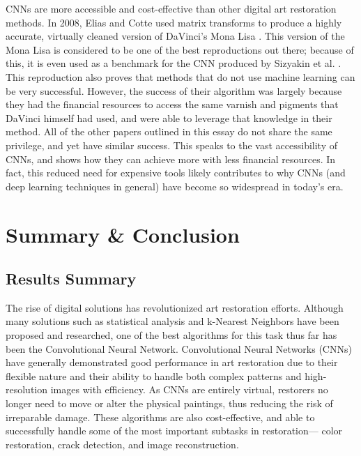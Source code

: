 \documentclass[a4paper,11pt]{article}
\begin{document}
CNNs are more accessible and cost-effective than other digital art restoration methods. In 2008, Elias and Cotte used matrix transforms to produce a highly accurate, virtually cleaned version of DaVinci's Mona Lisa \cite{elias}. This version of the Mona Lisa is considered to be one of the best reproductions out there; because of this, it is even used as a benchmark for the CNN produced by Sizyakin et al. \cite{sizyakin}. This reproduction also proves that methods that do not use machine learning can be very successful. However, the success of their algorithm was largely because they had the financial resources to access the same varnish and pigments that DaVinci himself had used, and were able to leverage that knowledge in their method. All of the other papers outlined in this essay do not share the same privilege, and yet have similar success. This speaks to the vast accessibility of CNNs, and shows how they can achieve more with less financial resources. In fact, this reduced need for expensive tools likely contributes to why CNNs (and deep learning techniques in general) have become so widespread in today’s era. 


\section{Summary \& Conclusion}

\subsection{Results Summary}

The rise of digital solutions has revolutionized art restoration efforts. Although many solutions such as statistical analysis and k-Nearest Neighbors have been proposed and researched, one of the best algorithms for this task thus far has been the Convolutional Neural Network. Convolutional Neural Networks (CNNs) have generally demonstrated good performance in art restoration due to their flexible nature and their ability to handle both complex patterns and high-resolution images with efficiency. As CNNs are entirely virtual, restorers no longer need to move or alter the physical paintings, thus reducing the risk of irreparable damage. These algorithms are also cost-effective, and able to successfully handle some of the most important subtasks in restoration— color restoration, crack detection, and image reconstruction. 
\end{document}
